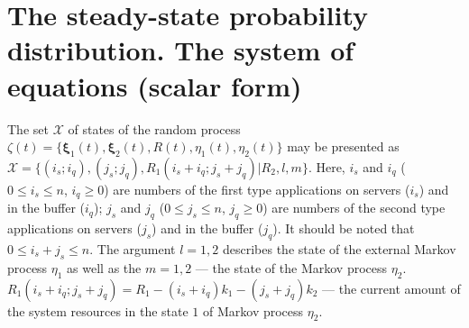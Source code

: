 \documentclass[default]{subfiles}
\begin{document}
{%

\section{The steady-state probability distribution. The system of
  equations (scalar form)}
\label{sec:base-steady}

The set $\mathcal{X}$ of states of the random process
$\zeta(t)=\{\mathbf{\xi}_1 (t), \mathbf{\xi}_2 (t),R(t),\eta_1
(t),\eta_2 (t)\}$ may be presented as
$\mathcal{X}=\{(i_s; i_q),(j_s; j_q),R_1(i_s+i_q;j_s+j_q)|R_2,l,m\}$.
Here, $i_s$ and $i_q$ ($0\leqslant i_s\leqslant n$, $i_q\geqslant 0$)
are numbers of the first type applications on servers ($i_s$) and in
the buffer ($i_q$); $j_s$ and $j_q$ ($0\leqslant j_s\leqslant n$,
$j_q\geqslant 0$) are numbers of the second type applications on
servers ($j_s$) and in the buffer ($j_q$).  It should be noted that
$0\leqslant i_s + j_s\leqslant n$. The argument $l=1,2$ describes the
state of the external Markov process $\eta_1$ as well as the $m=1,2$
--- the state of the Markov process
$\eta_2$. $R_1(i_s+i_q;j_s+j_q)=R_1-(i_s+i_q)k_1-(j_s+j_q)k_2$ --- the
current amount of the system resources in the state $1$ of Markov
process $\eta_2$.


}
\end{document}
